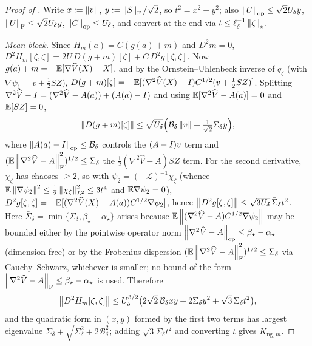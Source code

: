 \begin{proof}[Proof of ]
Write $x:=\left\lVert v\right\rVert$, $y:=\left\lVert S\right\rVert_{\mathrm{F}}/\sqrt2$, so $t^2=x^2+y^2$; also
$\left\lVert U\right\rVert_{\mathrm{op}}\leq\sqrt2U_\delta y$, $\left\lVert U\right\rVert_{\mathrm{F}}\leq\sqrt2U_\delta y$, $\left\lVert C\right\rVert_{\mathrm{op}}\leq U_\delta$,
and convert at the end via $t\leq\ell_\delta^{-1}\left\lVert \zeta\right\rVert_\star$.

\emph{Mean block.} Since $H_m(a)=C(g(a)+m)$ and $D^2m=0$,
$D^2H_m[\zeta,\zeta]=2U\,D(g+m)[\zeta]+C\,D^2g[\zeta,\zeta]$. Now
$g(a)+m=-\mathbb{E}[\nabla\widehat V(X)-X]$, and by the Ornstein--Uhlenbeck inverse of $q_\zeta$ (with
$\nabla\psi_1=v+\tfrac12SZ$), $D(g+m)[\zeta]=-\mathbb{E}[(\nabla^2\widehat V(X)-I)C^{1/2}(v+\tfrac12SZ)]$.
Splitting $\nabla^2\widehat V-I=(\nabla^2\widehat V-A(a))+(A(a)-I)$ and using
$\mathbb{E}[\nabla^2\widehat V-A(a)]=0$ and $\mathbb{E}[SZ]=0$,
\[
    \left\lVert D(g+m)[\zeta]\right\rVert\leq\sqrt{U_\delta}\Bigl(\mathcal B_\delta\left\lVert v\right\rVert+\tfrac1{\sqrt2}\Sigma_\delta y\Bigr),
\]
where $\left\lVert A(a)-I\right\rVert_{\mathrm{op}}\leq\mathcal B_\delta$ controls the $(A-I)v$ term and
$(\mathbb{E}\left\lVert \nabla^2\widehat V-A\right\rVert_{\mathrm{F}}^2)^{1/2}\leq\Sigma_\delta$ the $\tfrac12(\nabla^2\widehat V-A)SZ$
term. For the second derivative, $\chi_\zeta$ has chaoses $\geq2$, so with
$\psi_2=(-\mathcal L)^{-1}\chi_\zeta$ (whence $\mathbb{E}\left\lVert \nabla\psi_2\right\rVert^2\leq\tfrac12\left\lVert \chi_\zeta\right\rVert_{L^2}^2\leq3t^4$
and $\mathbb{E}\nabla\psi_2=0$), $D^2g[\zeta,\zeta]=-\mathbb{E}[(\nabla^2\widehat V(X)-A(a))C^{1/2}\nabla\psi_2]$, hence
$\left\lVert D^2g[\zeta,\zeta]\right\rVert\leq\sqrt{3U_\delta}\,\bar\Sigma_\delta t^2$. Here $\bar\Sigma_\delta=\min\{\Sigma_\delta,\beta_\star-\alpha_\star\}$
arises because $\mathbb{E}\left\lVert (\nabla^2\widehat V-A)C^{1/2}\nabla\psi_2\right\rVert$ may be bounded either by the pointwise
operator norm $\left\lVert \nabla^2\widehat V-A\right\rVert_{\mathrm{op}}\leq\beta_\star-\alpha_\star$ (dimension-free) or by the
Frobenius dispersion $(\mathbb{E}\left\lVert \nabla^2\widehat V-A\right\rVert_{\mathrm{F}}^2)^{1/2}\leq\Sigma_\delta$ via
Cauchy--Schwarz, whichever is smaller; no bound of the form $\left\lVert \nabla^2\widehat V-A\right\rVert_{\mathrm{F}}\leq\beta_\star-\alpha_\star$
is used. Therefore
\[
    \left\lVert D^2H_m[\zeta,\zeta]\right\rVert\leq U_\delta^{3/2}\bigl(2\sqrt2\,\mathcal B_\delta xy+2\Sigma_\delta y^2+\sqrt3\,\bar\Sigma_\delta t^2\bigr),
\]
and the quadratic form in $(x,y)$ formed by the first two terms has largest eigenvalue
$\Sigma_\delta+\sqrt{\Sigma_\delta^2+2\mathcal B_\delta^2}$; adding $\sqrt3\bar\Sigma_\delta t^2$ and
converting $t$ gives $K_{\mathrm{ng},m}$.


\end{proof}
